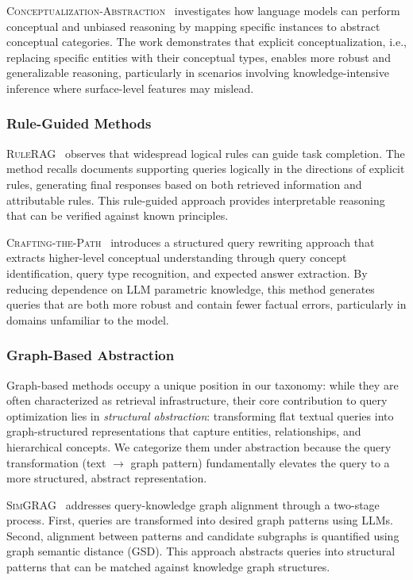 \documentclass{article}
\begin{document}
\textsc{Conceptualization-Abstraction}~\citep{Conceptualization-Abstraction} investigates how language models can perform conceptual and unbiased reasoning by mapping specific instances to abstract conceptual categories. The work demonstrates that explicit conceptualization, i.e., replacing specific entities with their conceptual types, enables more robust and generalizable reasoning, particularly in scenarios involving knowledge-intensive inference where surface-level features may mislead.

\subsubsection{Rule-Guided Methods}

\textsc{RuleRAG}~\citep{RuleRAG} observes that widespread logical rules can guide task completion. The method recalls documents supporting queries logically in the directions of explicit rules, generating final responses based on both retrieved information and attributable rules. This rule-guided approach provides interpretable reasoning that can be verified against known principles.

\textsc{Crafting-the-Path}~\citep{Crafting-the-Path} introduces a structured query rewriting approach that extracts higher-level conceptual understanding through query concept identification, query type recognition, and expected answer extraction. By reducing dependence on LLM parametric knowledge, this method generates queries that are both more robust and contain fewer factual errors, particularly in domains unfamiliar to the model.

\subsubsection{Graph-Based Abstraction}

Graph-based methods occupy a unique position in our taxonomy: while they are often characterized as retrieval infrastructure, their core contribution to query optimization lies in \textit{structural abstraction}: transforming flat textual queries into graph-structured representations that capture entities, relationships, and hierarchical concepts. We categorize them under abstraction because the query transformation (text $\rightarrow$ graph pattern) fundamentally elevates the query to a more structured, abstract representation.

\textsc{SimGRAG}~\citep{SimGRAG} addresses query-knowledge graph alignment through a two-stage process. First, queries are transformed into desired graph patterns using LLMs. Second, alignment between patterns and candidate subgraphs is quantified using graph semantic distance (GSD). This approach abstracts queries into structural patterns that can be matched against knowledge graph structures.
\end{document}
